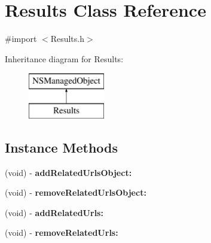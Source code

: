 \section{Results Class Reference}
\label{interface_results}


{\ttfamily \#import $<$Results.\+h$>$}

Inheritance diagram for Results\+:\begin{figure}[H]
\begin{center}
\leavevmode
\includegraphics[height=2.000000cm]{interface_results}
\end{center}
\end{figure}
\subsection*{Instance Methods}
\begin{DoxyCompactItemize}
\item 
(void) -\/ {\bfseries add\+Related\+Urls\+Object\+:}\label{interface_results_a1526b26c50ede74a2ba0fa0eb300cf71}

\item 
(void) -\/ {\bfseries remove\+Related\+Urls\+Object\+:}\label{interface_results_ac2e2798ae76c1aee90454218b74fefe7}

\item 
(void) -\/ {\bfseries add\+Related\+Urls\+:}\label{interface_results_a2f78d2ed026fcabd68d597555d315125}

\item 
(void) -\/ {\bfseries remove\+Related\+Urls\+:}\label{interface_results_a35442fde79db691eb5a1f9938a4907d3}

\end{DoxyCompactItemize}
